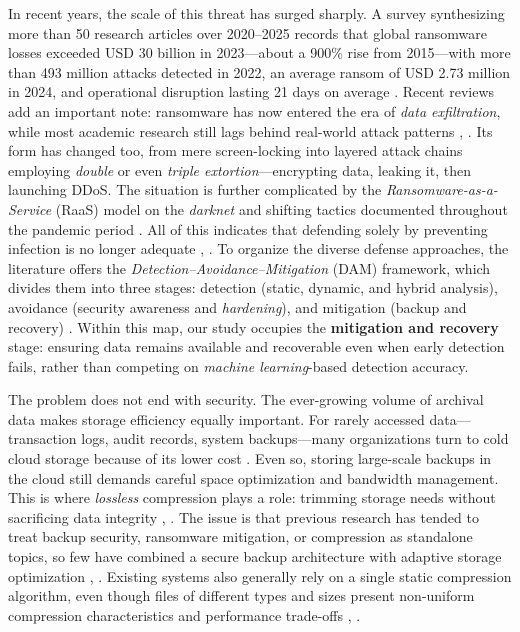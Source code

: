 \documentclass{iaesarticle}
\begin{document}
In recent years, the scale of this threat has surged sharply. A survey synthesizing more than 50 research articles over 2020--2025 records that global ransomware losses exceeded USD 30 billion in 2023---about a 900\% rise from 2015---with more than 493 million attacks detected in 2022, an average ransom of USD 2.73 million in 2024, and operational disruption lasting 21 days on average \cite{41}. Recent reviews add an important note: ransomware has now entered the era of \textit{data exfiltration}, while most academic research still lags behind real-world attack patterns \cite{23}, \cite{26}. Its form has changed too, from mere screen-locking into layered attack chains employing \textit{double} or even \textit{triple extortion}---encrypting data, leaking it, then launching DDoS. The situation is further complicated by the \textit{Ransomware-as-a-Service} (RaaS) model on the \textit{darknet} \cite{40} and shifting tactics documented throughout the pandemic period \cite{33}. All of this indicates that defending solely by preventing infection is no longer adequate \cite{42}, \cite{46}. To organize the diverse defense approaches, the literature offers the \textit{Detection--Avoidance--Mitigation} (DAM) framework, which divides them into three stages: detection (static, dynamic, and hybrid analysis), avoidance (security awareness and \textit{hardening}), and mitigation (backup and recovery) \cite{42}. Within this map, our study occupies the \textbf{mitigation and recovery} stage: ensuring data remains available and recoverable even when early detection fails, rather than competing on \textit{machine learning}-based detection accuracy.

The problem does not end with security. The ever-growing volume of archival data makes storage efficiency equally important. For rarely accessed data---transaction logs, audit records, system backups---many organizations turn to cold cloud storage because of its lower cost \cite{11}. Even so, storing large-scale backups in the cloud still demands careful space optimization and bandwidth management. This is where \textit{lossless} compression plays a role: trimming storage needs without sacrificing data integrity \cite{12}, \cite{13}. The issue is that previous research has tended to treat backup security, ransomware mitigation, or compression as standalone topics, so few have combined a secure backup architecture with adaptive storage optimization \cite{14}, \cite{15}. Existing systems also generally rely on a single static compression algorithm, even though files of different types and sizes present non-uniform compression characteristics and performance trade-offs \cite{16}, \cite{17}.
\end{document}
